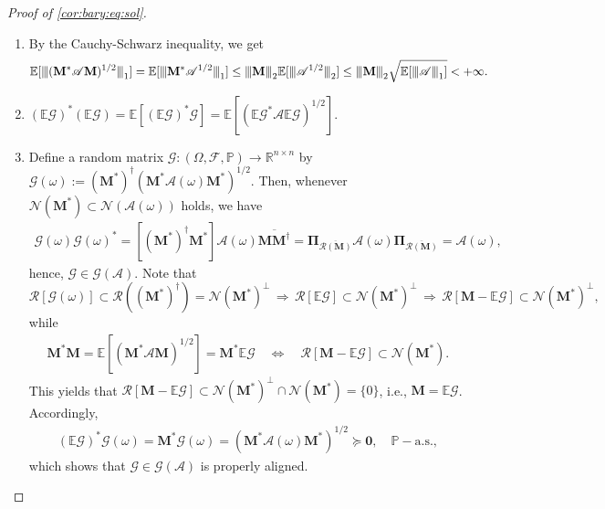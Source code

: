 \documentclass[noinfoline]{imsart}\setcounter{tocdepth}{2}
\renewcommand{\b}[1]{\mathbb{#1}} %
\newcommand{\m}[1]{\mathbf{#1}} %
\newcommand{\s}[1]{\mathscr{#1}} %
\renewcommand{\c}[1]{\mathcal{#1}} %
\newcommand{\vertiii}[1]{{\left\vert\kern-0.25ex\left\vert\kern-0.25ex\left\vert #1 
    \right\vert\kern-0.25ex\right\vert\kern-0.25ex\right\vert}} %
\newcommand{\vertii}[1]{{\vert\kern-0.25ex\vert\kern-0.25ex\vert #1 
    \vert\kern-0.25ex\vert\kern-0.25ex\vert}} %
\theoremstyle{plain}
\begin{document}
\begin{proof}[Proof of \cref{cor:bary:eq:sol}] \quad
\begin{enumerate}[leftmargin=*]
\item By the Cauchy-Schwarz inequality, we get
\begin{equation*}
    \b{E} [\vertii{(\m{M}^{*} \s{A} \m{M})^{1/2}}_{1}] = \b{E} [\vertii{\m{M}^{*} \s{A}^{1/2}}_{1}]
    \le \vertiii{\m{M}}_{2} \b{E} [ \vertii{\s{A}^{1/2}}_{2}] \le \vertiii{\m{M}}_{2} \sqrt{\b{E} [ \vertii{\s{A}}_{1}]} < + \infty.
\end{equation*}


\item $(\b{E} \s{G})^{*} (\b{E} \s{G}) = \b{E}[(\b{E} \s{G})^{*} \s{G}] = \b{E} [(\b{E} \s{G}^{*} \s{A} \b{E} \s{G})^{1/2}]$.

\item Define a random matrix $\s{G}: (\Omega, \s{F}, \b{P}) \to \b{R}^{n \times n}$ by $\s{G}(\omega) := (\m{M}^{*})^{\dagger} (\m{M}^{*} \s{A}(\omega) \m{M}^{*})^{1/2}$. Then, whenever $\c{N}(\m{M}^{*}) \subset \c{N}(\s{A}(\omega))$ holds, we have 
\begin{align*}
    \s{G}(\omega) \s{G}(\omega)^{*} = [(\m{M}^{*})^{\dagger} \m{M}^{*}] \s{A}(\omega) \overline{\m{M} \m{M}^{\dagger}} = \m{\Pi}_{\overline{\c{R}(\m{M})}} \s{A}(\omega) \m{\Pi}_{\overline{\c{R}(\m{M})}} = \s{A}(\omega),
\end{align*}
hence, $\s{G} \in \c{G}(\s{A})$. Note that 
\begin{equation*}
    \c{R}[\s{G}(\omega)] \subset \c{R}((\m{M}^{*})^{\dagger}) = \c{N}(\m{M}^{*})^{\perp} \, \Rightarrow \, \c{R}[\b{E}\s{G}] \subset \c{N}(\m{M}^{*})^{\perp} \, \Rightarrow \, \c{R}[\m{M} - \b{E}\s{G}] \subset \c{N}(\m{M}^{*})^{\perp},
\end{equation*}
while
\begin{align*}
    \m{M}^{*} \m{M} = \b{E} [(\m{M}^{*} \s{A} \m{M})^{1/2}] = \m{M}^{*} \b{E} \s{G} \quad \Leftrightarrow \quad \c{R}[\m{M} - \b{E}\s{G}] \subset \c{N}(\m{M}^{*}).
\end{align*}
This yields that $\c{R}[\m{M} - \b{E}\s{G}] \subset \c{N}(\m{M}^{*})^{\perp} \cap \c{N}(\m{M}^{*}) = \{0\}$, i.e., $\m{M} = \b{E} \s{G}$. Accordingly,
\begin{align*}
    (\b{E} \s{G})^{*} \s{G}(\omega) = \m{M}^{*} \s{G}(\omega) = (\m{M}^{*} \s{A}(\omega) \m{M}^{*})^{1/2} \succeq \m{0}, \quad \b{P}-\text{a.s.},
\end{align*}
which shows that $\s{G} \in \c{G}(\s{A})$ is properly aligned.
\end{enumerate}
\end{proof}
\end{document}

